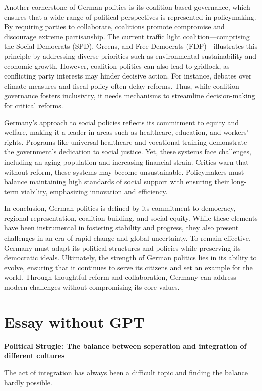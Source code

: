 \documentclass{article}
\begin{document}
Another cornerstone of German politics is its coalition-based governance, which ensures that a wide range of political perspectives is represented in policymaking. By requiring parties to collaborate, coalitions promote compromise and discourage extreme partisanship. The current traffic light coalition—comprising the Social Democrats (SPD), Greens, and Free Democrats (FDP)—illustrates this principle by addressing diverse priorities such as environmental sustainability and economic growth. However, coalition politics can also lead to gridlock, as conflicting party interests may hinder decisive action. For instance, debates over climate measures and fiscal policy often delay reforms. Thus, while coalition governance fosters inclusivity, it needs mechanisms to streamline decision-making for critical reforms.

Germany's approach to social policies reflects its commitment to equity and welfare, making it a leader in areas such as healthcare, education, and workers’ rights. Programs like universal healthcare and vocational training demonstrate the government’s dedication to social justice. Yet, these systems face challenges, including an aging population and increasing financial strain. Critics warn that without reform, these systems may become unsustainable. Policymakers must balance maintaining high standards of social support with ensuring their long-term viability, emphasizing innovation and efficiency.

In conclusion, German politics is defined by its commitment to democracy, regional representation, coalition-building, and social equity. While these elements have been instrumental in fostering stability and progress, they also present challenges in an era of rapid change and global uncertainty. To remain effective, Germany must adapt its political structures and policies while preserving its democratic ideals. Ultimately, the strength of German politics lies in its ability to evolve, ensuring that it continues to serve its citizens and set an example for the world. Through thoughtful reform and collaboration, Germany can address modern challenges without compromising its core values.

\newpage
\section{Essay without GPT}
\textbf{Political Strugle: The balance between seperation and integration of different cultures}

The act of integration has always been a difficult topic and finding the balance hardly possible. 
\end{document}
